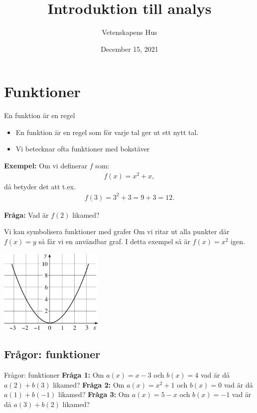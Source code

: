 \documentclass{beamer}
\institute{Mentorsprogram i matematik}
\author{Vetenskapens Hus}
\date{December 15, 2021}
\title{Introduktion till analys}
\begin{document}
\maketitle



\section*{Funktioner}
\label{sec:orga35961a}
\begin{frame}{En funktion är en regel}
\begin{itemize}
\item En funktion är en regel som för varje tal ger ut ett nytt tal.
\item Vi betecknar ofta funktioner med bokstäver
\end{itemize}
\textbf{Exempel:}
Om vi definerar \(f\) som:
\begin{align*}
f(x) = x^2 + x
,
\end{align*}
då betyder det att t.ex.
\begin{align*}
f(3) = 3 ^2 + 3 = 9 + 3 = 12
.
\end{align*}

\textbf{Fråga:}
Vad är \(f(2)\) likamed?
\end{frame}

\begin{frame}{Vi kan symbolisera funktioner med grafer}
Om vi ritar ut alla punkter där \(f(x)=y\) så får vi
en användbar graf. I detta exempel så är \(f(x) = x^2\) igen.
\begin{center}
\includegraphics[angle=0,width=5cm]{./img/squared.png}
\end{center}
\end{frame}

\subsection*{Frågor: funktioner}
\label{sec:orge3b3e25}
\begin{frame}{Frågor: funktioner}
\textbf{Fråga 1:} Om \(a(x) = x - 3\) och \(b(x) = 4\) vad är då 
\(a(2) + b(3)\) likamed?
\newline
\textbf{Fråga 2:} Om \(a(x) = x^2+1\) och \(b(x) = 0\) vad är då 
\(a(1) + b(-1)\) likamed?
\newline
\textbf{Fråga 3:} Om \(a(x) = 5 - x\) och \(b(x) = -1\) vad är då 
\(a(3) + b(2)\) likamed?
\end{frame}
\end{document}
